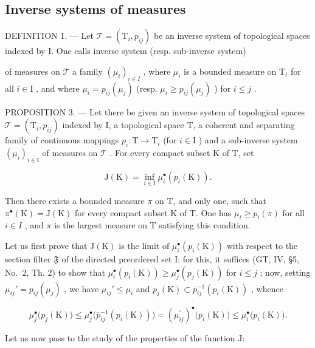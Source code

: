 \subsection{Inverse systems of measures}

DEFINITION 1. --- Let \(\mathcal{T} = (\mathrm{T}_i, p_{ij})\) be an inverse system of topological spaces indexed by I. One calls inverse system (resp. sub-inverse system)

of measures on \(\mathcal{T}\) a family \((\mu_i)_{i\in I}\) , where \(\mu_i\) is a bounded measure on \(\mathrm{T}_i\) for all \(i\in \mathrm{I}\) , and where \(\mu_i = p_{ij}(\mu_j)\) (resp. \(\mu_i\geqslant p_{ij}(\mu_j)\) ) for \(i\leqslant j\) .

PROPOSITION 3. --- Let there be given an inverse system of topological spaces \(\mathcal{T} = (\mathrm{T}_i, p_{ij})\) indexed by I, a topological space T, a coherent and separating family of continuous mappings \(p_i: \mathrm{T} \to \mathrm{T}_i\) (for \(i \in \mathrm{I}\) ) and a sub-inverse system \((\mu_i)_{i \in \mathrm{I}}\) of measures on \(\mathcal{T}\) . For every compact subset K of T, set

\[
\mathrm{J} (\mathrm{K}) = \inf _ {i \in \mathrm{I}} \mu_ {i} ^ {\bullet} (p _ {i} (\mathrm{K})).\tag{1}
\]

Then there exists a bounded measure \(\pi\) on T, and only one, such that \(\pi^{\bullet}(\mathrm{K}) = \mathrm{J}(\mathrm{K})\) for every compact subset K of T. One has \(\mu_i \geqslant p_i(\pi)\) for all \(i \in I\) , and \(\pi\) is the largest measure on T satisfying this condition.

Let us first prove that \(\mathrm{J}(\mathrm{K})\) is the limit of \(\mu_i^\bullet (p_i(\mathrm{K}))\) with respect to the section filter \(\mathfrak{F}\) of the directed preordered set I: for this, it suffices (GT, IV, §5, No.~2, Th. 2) to show that \(\mu_i^\bullet (p_i(\mathrm{K})) \geqslant \mu_j^\bullet (p_j(\mathrm{K}))\) for \(i \leqslant j\) ; now, setting \(\mu_{ij}' = p_{ij}(\mu_j)\) , we have \(\mu_{ij}' \leqslant \mu_i\) and \(p_j(\mathrm{K}) \subset \overline{p}_{ij}^{-1}(p_i(\mathrm{K}))\) , whence

\[
\mu_ {j} ^ {\bullet} \big (p _ {j} (\mathrm{K}) \big) \leqslant \mu_ {j} ^ {\bullet} \big (\overline{p}_{ij}^{-1} (p _ {i} (\mathrm{K})) \big) = (\mu_ {i j} ^ {\prime}) ^ {\bullet} \big (p _ {i} (\mathrm{K}) \big) \leqslant \mu_ {i} ^ {\bullet} \big (p _ {i} (\mathrm{K}) \big).
\]

Let us now pass to the study of the properties of the function J:


